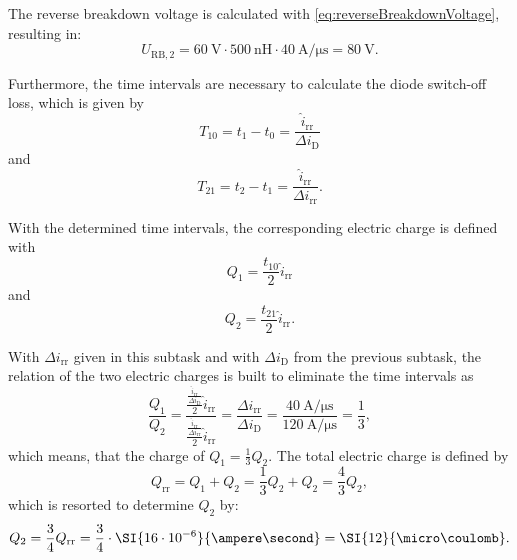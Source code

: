 \begin{solutionblock}
    The reverse breakdown voltage is calculated with \eqref{eq:reverseBreakdownVoltage}, resulting in:
    \begin{equation}
        U_{\mathrm{RB,2}} = \SI{60}{\volt} \cdot \SI{500}{\nano\henry} \cdot \SI{40}{\ampere\per\micro\second} = \SI{80}{\volt}.
        \label{eq:RB_2}
    \end{equation}

    Furthermore, the time intervals are necessary to calculate the diode switch-off loss, which is given by  
    \begin{equation}
        T_{10} = t_1 - t_0 = \frac{\hat{i}_{\mathrm{rr}}}{\Delta i_{\mathrm{D}}}
    \end{equation}
    and
    \begin{equation}
        T_{21} = t_2 - t_1 = \frac{\hat{i}_{\mathrm{rr}}}{\Delta i_{\mathrm{rr}}}.
    \end{equation}

    With the determined time intervals, the corresponding electric charge is defined with
    \begin{equation}
        Q_1 = \frac{t_{10}}{2}\hat{i}_{\mathrm{rr}}
    \end{equation}
    and
    \begin{equation}
        Q_2 = \frac{t_{21}}{2} \hat{i}_{\mathrm{rr}}.
    \end{equation}

    With $\Delta i_{\mathrm{rr}}$ given in this subtask and with $\Delta i_{\mathrm{D}}$ from the previous subtask, the relation of the two electric charges is built to eliminate the time intervals as
    \begin{equation}
        \frac{Q_{1}}{Q_{2}} = \frac{\frac{\frac{\hat{i}_{\mathrm{rr}}}{\Delta i_{\mathrm{D}}}}{2}\hat{i}_{\mathrm{rr}}}{\frac{\frac{\hat{i}_{\mathrm{rr}}}{\Delta i_{\mathrm{rr}}}}{2}\hat{i}_{\mathrm{rr}}} 
        = \frac{\Delta i_{\mathrm{rr}}}{\Delta i_{\mathrm{D}}}
        = \frac{\SI{40}{\ampere\per\micro\second}}{\SI{120}{\ampere\per\micro\second}}
        = \frac{1}{3},
    \end{equation}
    which means, that the charge of $Q_1 = \frac{1}{3} Q_2$.
    The total electric charge is defined by
    \begin{equation}
        Q_{\mathrm{rr}} = Q_1 + Q_2 = \frac{1}{3}Q_2 + Q_2 = \frac{4}{3}Q_2,
    \end{equation}
    which is resorted to determine $Q_2$ by:
    \begin{equation}
        Q_2 = \frac{3}{4}Q_{\mathrm{rr}} = \frac{3}{4}\cdot \SI{16\cdot10^{-6}}{\ampere\second}
        = \SI{12}{\micro\coulomb}.
    \end{equation}


\end{solutionblock}
